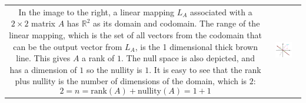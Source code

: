 \documentclass{article}
\begin{document}
\begin{tabular}{cc}
\parbox{0.4\textwidth}{
In the image to the right, a linear mapping \(L_A\) associated with a \(2 \times 2\) matrix \(A\) has \(\mathbb{R}^2\) as its domain and codomain. The range of the linear mapping, which is the set of all vectors from the codomain that can be the output vector from \(L_A\), is the 1 dimensional thick brown line. This gives \(A\) a rank of \(1\). The null space is also depicted, and has a dimension of \(1\) so the nullity is \(1\). It is easy to see that the rank plus nullity is the number of dimensions of the domain, which is \(2\):
\[2 = n = \text{rank}(A) + \text{nullity}(A) = 1 + 1\]
} & \parbox{0.6\textwidth}{
\includegraphics[width = 0.6\textwidth]{linear_mapping_range}
}
\end{tabular}
\end{document}
